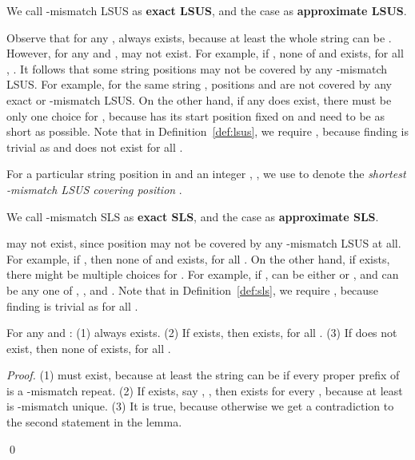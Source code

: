\documentclass[11pt]{llncs}
\newcommand{\remove}[1]{}
\begin{document}
We call -mismatch LSUS as {\bf exact
  LSUS}, and the case  as {\bf approximate
  LSUS}.

Observe that for any ,  always exists, because
at least the whole string  can be . However, for any
 and ,  may not exist. For example, if
, none of  and  exists, for all
, . It follows that some string positions may not be
covered by any -mismatch LSUS. For example, for the same string
, positions  and  are not covered by any exact
or -mismatch LSUS. On the other hand, if any  does
exist, there must be only one choice for , because
 has its start position fixed on  and need to be as
short as possible.
Note that in Definition~\ref{def:lsus}, we require , because
finding  is trivial as  and 
does not exist for all .  



\begin{definition}
\label{def:sls}
For a particular string position  in  and an integer , , we use  to denote the \emph{shortest -mismatch LSUS 
covering position }.
\end{definition}

We call -mismatch SLS as {\bf exact
  SLS}, and the case  as {\bf approximate
  SLS}.

 may not exist, since position  may not be covered by any
-mismatch LSUS at all. For example, if , then none
of  and  exists, for all .  On the other
hand, if  exists, there might be multiple choices for
.  For example, if ,  can be
either  or , and 
can be any one of , , and
.
Note that in Definition~\ref{def:sls}, we require , because
finding  is trivial as  for all .





\begin{lemma}
\label{lem:exist}
For any  and : (1)  always exists. (2) If
 exists, then  exists, for all .
 (3) If  does not exist, then none of  exists,
for all  .
\end{lemma}

\begin{proof}
(1)  must exist, because at least the string  can be
 if every proper prefix of  is a -mismatch repeat. 
(2) If  exists, say , ,
then 
 exists for every , because at least  is
-mismatch unique.
(3) It is true, because otherwise we get a contradiction to the second
statement in the lemma. 
\remove{
If  does not exist, it means  is a
-mismatch repeat. It follows that
every suffix  of , , is
also a -mismatch repeat, i.e., none of 
 exists, for all .}
\qed
\end{proof}
\end{document}
